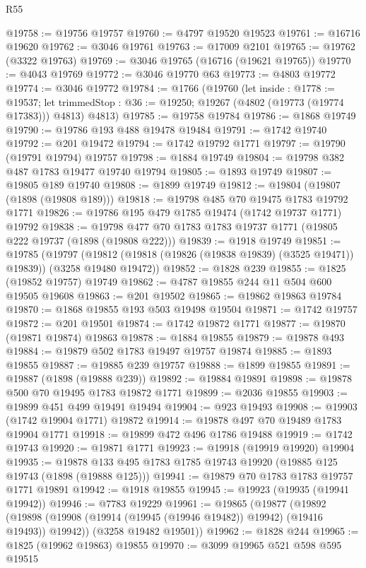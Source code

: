 \begin{lexlean}{R55}
\begin{coremodule}
@19758 := @19756 @19757
@19760 := @4797 @19520 @19523
@19761 := @16716 @19620
@19762 := @3046 @19761
@19763 := @17009 @2101
@19765 := @19762 (@3322 @19763)
@19769 := @3046 @19765 (@16716 (@19621 @19765))
@19770 := @4043 @19769
@19772 := @3046 @19770 @63
@19773 := @4803 @19772
@19774 := @3046 @19772
@19784 := @1766
    (@19760
      (let inside : @1778 := @19537;
      let trimmedStop : @36 := @19250; @19267 (@4802 (@19773 (@19774 @17383))) @4813)
      @4813)
@19785 := @19758 @19784
@19786 := @1868 @19749
@19790 := @19786 @193 @488 @19478 @19484
@19791 := @1742 @19740
@19792 := @201 @19472
@19794 := @1742 @19792 @1771
@19797 := @19790 (@19791 @19794) @19757
@19798 := @1884 @19749
@19804 := @19798 @382 @487 @1783 @19477 @19740 @19794
@19805 := @1893 @19749
@19807 := @19805 @189 @19740
@19808 := @1899 @19749
@19812 := @19804 (@19807 (@1898 (@19808 @189)))
@19818 := @19798 @485 @70 @19475 @1783 @19792 @1771
@19826 := @19786 @195 @479 @1785 @19474 (@1742 @19737 @1771) @19792
@19838 := @19798 @477 @70 @1783 @1783 @19737 @1771 (@19805 @222 @19737 (@1898 (@19808 @222)))
@19839 := @1918 @19749
@19851 := @19785
    (@19797 (@19812 (@19818 (@19826 (@19838 @19839) (@3525 @19471)) @19839)) (@3258 @19480 @19472))
@19852 := @1828 @239
@19855 := @1825 (@19852 @19757) @19749
@19862 := @4787 @19855 @244 @11 @504 @600 @19505 @19608
@19863 := @201 @19502
@19865 := @19862 @19863 @19784
@19870 := @1868 @19855 @193 @503 @19498 @19504
@19871 := @1742 @19757
@19872 := @201 @19501
@19874 := @1742 @19872 @1771
@19877 := @19870 (@19871 @19874) @19863
@19878 := @1884 @19855
@19879 := @19878 @493
@19884 := @19879 @502 @1783 @19497 @19757 @19874
@19885 := @1893 @19855
@19887 := @19885 @239 @19757
@19888 := @1899 @19855
@19891 := @19887 (@1898 (@19888 @239))
@19892 := @19884 @19891
@19898 := @19878 @500 @70 @19495 @1783 @19872 @1771
@19899 := @2036 @19855
@19903 := @19899 @451 @499 @19491 @19494
@19904 := @923 @19493
@19908 := @19903 (@1742 @19904 @1771) @19872
@19914 := @19878 @497 @70 @19489 @1783 @19904 @1771
@19918 := @19899 @472 @496 @1786 @19488
@19919 := @1742 @19743
@19920 := @19871 @1771
@19923 := @19918 (@19919 @19920) @19904
@19935 := @19878 @133 @495 @1783 @1785 @19743 @19920 (@19885 @125 @19743 (@1898 (@19888 @125)))
@19941 := @19879 @70 @1783 @1783 @19757 @1771 @19891
@19942 := @1918 @19855
@19945 := @19923 (@19935 (@19941 @19942))
@19946 := @7783 @19229
@19961 := @19865
    (@19877
      (@19892 (@19898 (@19908 (@19914 (@19945 (@19946 @19482)) @19942) (@19416 @19493)) @19942))
      (@3258 @19482 @19501))
@19962 := @1828 @244
@19965 := @1825 (@19962 @19863) @19855
@19970 := @3099 @19965 @521 @598 @595 @19515

\end{coremodule}
\end{lexlean}
